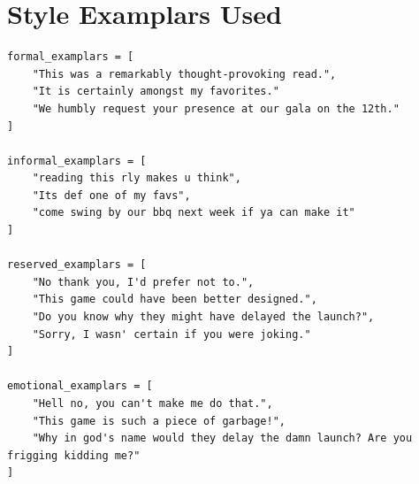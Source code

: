 \documentclass[a4paper]{article}
\begin{document}
\pagebreak
\printbibliography

\appendix

\section{Style Examplars Used}
\begin{verbatim}
formal_examplars = [
    "This was a remarkably thought-provoking read.",
    "It is certainly amongst my favorites."
    "We humbly request your presence at our gala on the 12th."
]

informal_examplars = [
    "reading this rly makes u think",
    "Its def one of my favs",
    "come swing by our bbq next week if ya can make it"
]

reserved_examplars = [          
    "No thank you, I'd prefer not to.",
    "This game could have been better designed.",
    "Do you know why they might have delayed the launch?",
    "Sorry, I wasn' certain if you were joking."
]

emotional_examplars = [
    "Hell no, you can't make me do that.",
    "This game is such a piece of garbage!",
    "Why in god's name would they delay the damn launch? Are you frigging kidding me?"
]
\end{verbatim}
\end{document}
